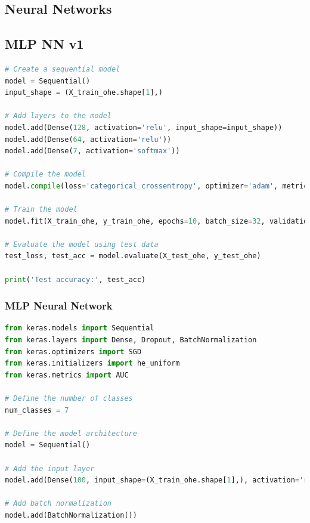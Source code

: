 \begin{appendices}
\newpage


\newpage



\section{Neural Networks}
\label{appx: Neural Networks}

\subsection{MLP NN v1}
\label{appx: MLP NN v1}

\begin{lstlisting}[language=Python]
# Create a sequential model
model = Sequential()
input_shape = (X_train_ohe.shape[1],)

# Add layers to the model
model.add(Dense(128, activation='relu', input_shape=input_shape))
model.add(Dense(64, activation='relu'))
model.add(Dense(7, activation='softmax'))

# Compile the model
model.compile(loss='categorical_crossentropy', optimizer='adam', metrics=['accuracy'])

# Train the model
model.fit(X_train_ohe, y_train_ohe, epochs=10, batch_size=32, validation_data=(X_test_ohe, y_test_ohe))

# Evaluate the model using test data
test_loss, test_acc = model.evaluate(X_test_ohe, y_test_ohe)

print('Test accuracy:', test_acc)
\end{lstlisting}

\subsubsection{MLP Neural Network}
\label{appx: MLP NN}

\begin{lstlisting}[language=Python]
from keras.models import Sequential
from keras.layers import Dense, Dropout, BatchNormalization
from keras.optimizers import SGD
from keras.initializers import he_uniform
from keras.metrics import AUC

# Define the number of classes
num_classes = 7

# Define the model architecture
model = Sequential()

# Add the input layer
model.add(Dense(100, input_shape=(X_train_ohe.shape[1],), activation='relu', kernel_initializer=he_uniform()))

# Add batch normalization
model.add(BatchNormalization())


\end{lstlisting}
\end{appendices}
